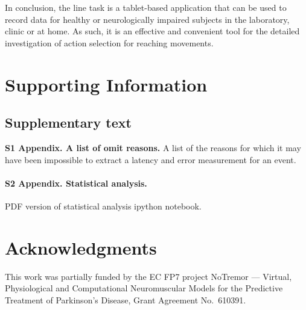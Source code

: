 \documentclass[10pt,letterpaper]{article}
\begin{document}
In conclusion, the line task is a tablet-based application that can be
used to record data for healthy or neurologically impaired subjects in
the laboratory, clinic or at home. As such, it is an effective and
convenient tool for the detailed investigation of action selection for
reaching movements.

\section*{Supporting Information}

\subsection*{Supplementary text}

\label{linetask_omitreasons}
{\bf S1 Appendix. A list of omit reasons.} A list of the reasons for which it may
have been impossible to extract a latency and error measurement for an
event.

\label{linetask_anova}
\paragraph{S2 Appendix. Statistical analysis.} PDF version of statistical analysis
ipython notebook.

\section*{Acknowledgments}

This work was partially funded by the EC FP7 project NoTremor ---
Virtual, Physiological and Computational Neuromuscular Models for the
Predictive Treatment of Parkinson's Disease, Grant Agreement
No.~610391.

\nolinenumbers

%
%
%

\end{document}

